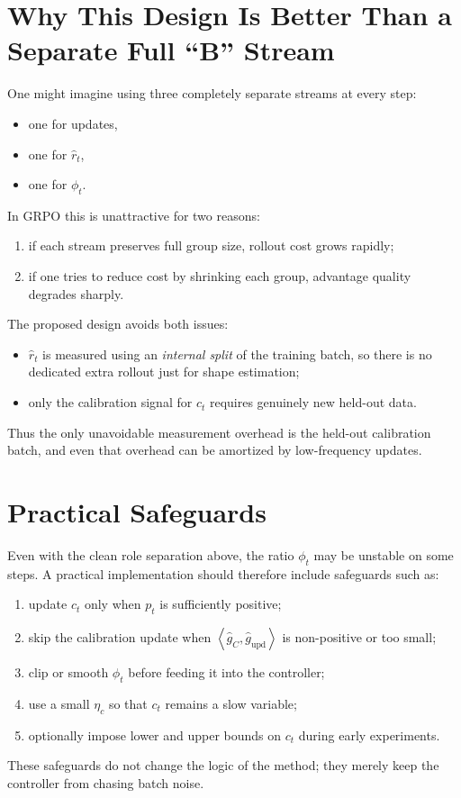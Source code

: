 \documentclass[11pt,a4paper]{article}
\newcommand{\ip}[2]{\left\langle #1,#2 \right\rangle}
\newcommand{\ghat}{\hat g}
\newcommand{\rhat}{\hat r_t}
\newcommand{\phit}{\phi_t}
\begin{document}
\section{Why This Design Is Better Than a Separate Full ``B'' Stream}
One might imagine using three completely separate streams at every step:
\begin{itemize}[leftmargin=2em]
    \item one for updates,
    \item one for $\rhat$,
    \item one for $\phit$.
\end{itemize}
In GRPO this is unattractive for two reasons:
\begin{enumerate}[label=\arabic*., leftmargin=2em]
    \item if each stream preserves full group size, rollout cost grows rapidly;
    \item if one tries to reduce cost by shrinking each group, advantage quality degrades sharply.
\end{enumerate}
The proposed design avoids both issues:
\begin{itemize}[leftmargin=2em]
    \item $\rhat$ is measured using an \emph{internal split} of the training batch, so there is no dedicated extra rollout just for shape estimation;
    \item only the calibration signal for $c_t$ requires genuinely new held-out data.
\end{itemize}
Thus the only unavoidable measurement overhead is the held-out calibration batch, and even that overhead can be amortized by low-frequency updates.

\section{Practical Safeguards}
Even with the clean role separation above, the ratio $\phit$ may be unstable on some steps. A practical implementation should therefore include safeguards such as:
\begin{enumerate}[label=\arabic*., leftmargin=2em]
    \item update $c_t$ only when $p_t$ is sufficiently positive;
    \item skip the calibration update when $\ip{\ghat_C}{\ghat_{\mathrm{upd}}}$ is non-positive or too small;
    \item clip or smooth $\phit$ before feeding it into the controller;
    \item use a small $\eta_c$ so that $c_t$ remains a slow variable;
    \item optionally impose lower and upper bounds on $c_t$ during early experiments.
\end{enumerate}
These safeguards do not change the logic of the method; they merely keep the controller from chasing batch noise.
\end{document}

